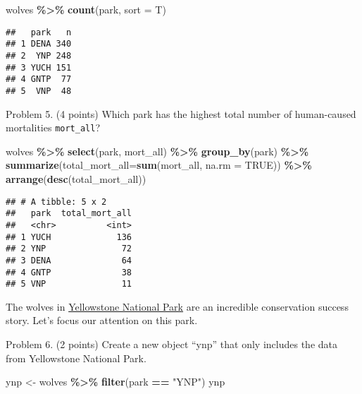 \documentclass[
]{article}
\newenvironment{Shaded}{\begin{snugshade}}{\end{snugshade}}
\newcommand{\AttributeTok}[1]{\textcolor[rgb]{0.13,0.29,0.53}{#1}}
\newcommand{\ConstantTok}[1]{\textcolor[rgb]{0.56,0.35,0.01}{#1}}
\newcommand{\FunctionTok}[1]{\textcolor[rgb]{0.13,0.29,0.53}{\textbf{#1}}}
\newcommand{\NormalTok}[1]{#1}
\newcommand{\OtherTok}[1]{\textcolor[rgb]{0.56,0.35,0.01}{#1}}
\newcommand{\SpecialCharTok}[1]{\textcolor[rgb]{0.81,0.36,0.00}{\textbf{#1}}}
\newcommand{\StringTok}[1]{\textcolor[rgb]{0.31,0.60,0.02}{#1}}
\begin{document}
\begin{Shaded}
\begin{Highlighting}[]
\NormalTok{wolves }\SpecialCharTok{\%\textgreater{}\%} 
  \FunctionTok{count}\NormalTok{(park, }\AttributeTok{sort =}\NormalTok{ T)}
\end{Highlighting}
\end{Shaded}

\begin{verbatim}
##   park   n
## 1 DENA 340
## 2  YNP 248
## 3 YUCH 151
## 4 GNTP  77
## 5  VNP  48
\end{verbatim}

Problem 5. (4 points) Which park has the highest total number of
human-caused mortalities \texttt{mort\_all}?

\begin{Shaded}
\begin{Highlighting}[]
\NormalTok{wolves }\SpecialCharTok{\%\textgreater{}\%} 
  \FunctionTok{select}\NormalTok{(park, mort\_all) }\SpecialCharTok{\%\textgreater{}\%} 
  \FunctionTok{group\_by}\NormalTok{(park) }\SpecialCharTok{\%\textgreater{}\%} 
  \FunctionTok{summarize}\NormalTok{(}\AttributeTok{total\_mort\_all=}\FunctionTok{sum}\NormalTok{(mort\_all, }\AttributeTok{na.rm =} \ConstantTok{TRUE}\NormalTok{)) }\SpecialCharTok{\%\textgreater{}\%} 
  \FunctionTok{arrange}\NormalTok{(}\FunctionTok{desc}\NormalTok{(total\_mort\_all))}
\end{Highlighting}
\end{Shaded}

\begin{verbatim}
## # A tibble: 5 x 2
##   park  total_mort_all
##   <chr>          <int>
## 1 YUCH             136
## 2 YNP               72
## 3 DENA              64
## 4 GNTP              38
## 5 VNP               11
\end{verbatim}

The wolves in
\href{https://www.nps.gov/yell/learn/nature/wolf-restoration.htm}{Yellowstone
National Park} are an incredible conservation success story. Let's focus
our attention on this park.

Problem 6. (2 points) Create a new object ``ynp'' that only includes the
data from Yellowstone National Park.

\begin{Shaded}
\begin{Highlighting}[]
\NormalTok{ynp }\OtherTok{\textless{}{-}}\NormalTok{ wolves }\SpecialCharTok{\%\textgreater{}\%} 
  \FunctionTok{filter}\NormalTok{(park }\SpecialCharTok{==} \StringTok{"YNP"}\NormalTok{)}
\NormalTok{ynp}
\end{Highlighting}
\end{Shaded}
\end{document}
